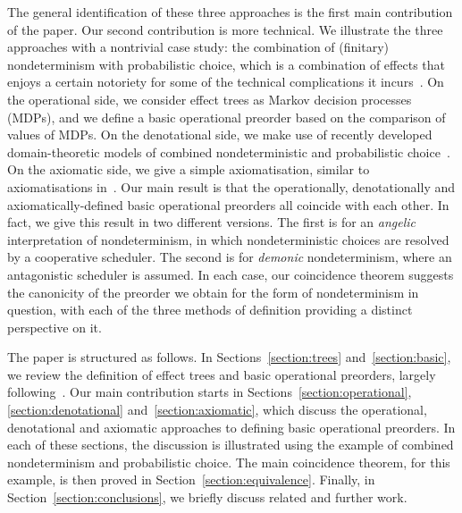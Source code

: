 The general identification of these three approaches is the first main contribution of the paper.
Our second contribution is more technical. We illustrate the three approaches
with a nontrivial case study: the combination of (finitary) nondeterminism with probabilistic choice, which is a combination of effects that enjoys a certain notoriety 
for some of the technical complications it incurs~\cite{Mislove2000,mislove2004axioms,VW06,tix2009semantic,JGL15,JGL-mscs16,KeimelP2016}.
On the operational side, we consider effect trees as Markov decision processes (MDPs), and we define a basic operational preorder based on the comparison of values of MDPs. On the denotational side, we make use of recently developed domain-theoretic models of combined nondeterministic and probabilistic choice~\cite{tix2009semantic,JGL-mscs16,KeimelP2016}.
On the axiomatic side, we give a simple axiomatisation, similar to axiomatisations in~\cite{mislove2004axioms,KeimelP2016}. 
Our main result is that the
operationally, denotationally and axiomatically-defined basic operational preorders all coincide with each other.
In fact, we give this result in two different versions.
The first is for an \emph{angelic} interpretation of nondeterminism, in which nondeterministic choices are resolved by a cooperative scheduler. The second is for \emph{demonic} nondeterminism, where an antagonistic scheduler is assumed. 
In each case, our coincidence theorem suggests the canonicity of the  preorder we obtain for the form of nondeterminism in question, with each of the three methods of definition providing a distinct perspective on it. 

The paper is structured as follows. In Sections~\ref{section:trees} and~\ref{section:basic}, we review the 
definition of effect trees and basic operational preorders, largely following~\cite{gom}. Our main contribution starts in Sections~\ref{section:operational}, \ref{section:denotational} and~\ref{section:axiomatic}, which discuss the 
operational, denotational and axiomatic approaches to defining basic operational preorders. In each of these sections, the discussion is illustrated using the example of combined nondeterminism and probabilistic choice. 
The main coincidence theorem, for this example, is then proved in Section~\ref{section:equivalence}. Finally, in Section~\ref{section:conclusions}, we briefly discuss related and further work.






